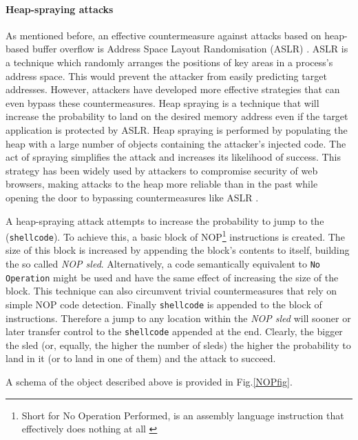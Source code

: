 \paragraph{Heap-spraying attacks}
As mentioned before, an effective countermeasure against attacks based on heap-based buffer overflow is Address Space Layout Randomisation (ASLR) \cite{Bhatkar:2003:AOE}. ASLR is a technique which randomly arranges the positions of key areas in a process's address space. This would prevent the attacker from easily predicting target addresses. 
However, attackers have developed more effective strategies that can even bypass these countermeasures. 
Heap spraying \cite{heapspray} is a technique that will increase the probability to land on the desired memory address even if the target application is protected by ASLR. Heap spraying is performed by populating the heap with a large number of objects containing the attacker's injected code.
The act of spraying simplifies the attack and increases its likelihood of success.
This strategy has been widely used by attackers to compromise security of web browsers, making attacks to the heap more reliable than in the past while opening the door to bypassing countermeasures like ASLR \cite{ffspray,pdfspray,asspray,iespray,safarispray}.

A heap-spraying attack attempts to increase the probability to jump to the (\texttt{shellcode}). To achieve this, a basic block of NOP\footnote{Short for No Operation Performed, is an assembly language instruction that effectively does nothing at all \cite{32intel}} instructions is created. The size of this block is increased by appending the block's contents to itself, building the so called \textit{NOP sled}. Alternatively, a code semantically equivalent to \texttt{No Operation} might be used and have the same effect of increasing the size of the block. This technique can also circumvent trivial countermeasures that rely on simple NOP code detection.
Finally \texttt{shellcode} is appended to the block of instructions. Therefore a jump to any location within the \textit{NOP sled} will sooner or later transfer control to the \texttt{shellcode} appended at the end. 
Clearly, the bigger the sled (or, equally, the higher the number of sleds) the higher the probability to land in it (or to land in one of them) and the attack to succeed.

A schema of the object described above is provided in Fig.\ref{NOPfig}. 

